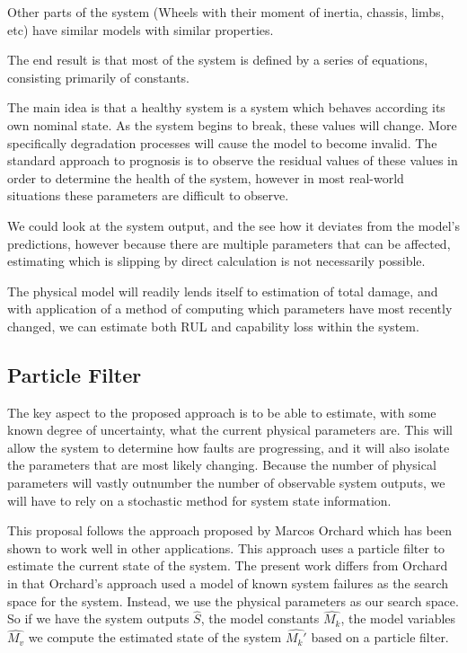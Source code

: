 \documentclass[12pt]{article}
\begin{document}
Other parts of the system (Wheels with their moment of inertia,
chassis, limbs, etc) have similar models with similar properties.

The end result is that most of the system is defined by a series of
equations, consisting primarily of constants.

The main idea is that a healthy system is a system which behaves
according its own nominal state.  As the system begins to break, these
values will change.  More specifically degradation processes will
cause the model to become invalid.  The standard approach to prognosis
is to observe the residual values of these values in order to
determine the health of the system, however in most real-world
situations these parameters are difficult to observe.

We could look at the system output, and the see how it deviates from
the model's predictions, however because there are multiple parameters
that can be affected, estimating which is slipping by direct
calculation is not necessarily possible.

The physical model will readily lends itself to estimation of total
damage, and with application of a method of computing which parameters
have most recently changed, we can estimate both RUL and capability
loss within the system.

\subsection{Particle Filter}
The key aspect to the proposed approach is to be able to estimate,
with some known degree of uncertainty, what the current physical
parameters are.  This will allow the system to determine how faults
are progressing, and it will also isolate the parameters that are most
likely changing.  Because the number of physical parameters will
vastly outnumber the number of observable system outputs, we will have
to rely on a stochastic method for system state information.

This proposal follows the approach proposed by Marcos Orchard
\cite{orchard} which has been shown to work well in other
applications.  This approach uses a particle filter to estimate the
current state of the system.  The present work differs from Orchard in
that Orchard's approach used a model of known system failures as the
search space for the system.  Instead, we use the physical parameters
as our search space.  So if we have the system outputs $\hat{S}$, the
model constants $\hat{M_k}$, the model variables $\hat{M_v}$ we
compute the estimated state of the system $\hat{M_k'}$ based on a
particle filter.
\end{document}
